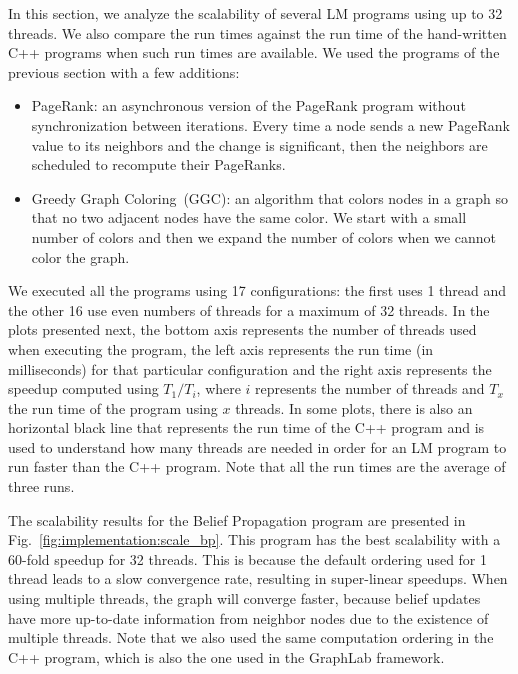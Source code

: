 In this section, we analyze the scalability of several LM programs using up to
32 threads. We also compare the run times against the run time of the
hand-written C++ programs when such run times are available. We used the
programs of the previous section with a few additions:

\begin{itemize}

      \item PageRank: an asynchronous version of the PageRank program without
         synchronization between iterations. Every time a node sends a new
         PageRank value to its neighbors and the change is significant, then the
         neighbors are scheduled to recompute their PageRanks.

      \item Greedy Graph Coloring~(GGC): an algorithm that colors nodes in a
         graph so that no two adjacent nodes have the same color. We start with
         a small number of colors and then we expand the number of colors when
         we cannot color the graph.

\end{itemize}

We executed all the programs using 17 configurations: the first uses 1 thread
and the other 16 use even numbers of threads for a maximum of 32 threads. In the
plots presented next, the bottom axis represents the number of threads used when
executing the program, the left axis represents the run time (in milliseconds)
for that particular configuration and the right axis represents the speedup
computed using $T_1/T_i$, where $i$ represents the number of threads and
$T_x$ the run time of the program using $x$ threads.  In some plots, there is
also an horizontal black line that represents the run time of the C++ program
and is used to understand how many threads are needed in order for an LM program
to run faster than the C++ program. Note that all the run times are the average
of three runs.

\newcommand{\plotsize}[0]{0.4}

The scalability results for the Belief Propagation program are presented in
Fig.~\ref{fig:implementation:scale_bp}. This program has the best scalability
with a 60-fold speedup for 32 threads. This is because the default ordering used
for 1 thread leads to a slow convergence rate, resulting in super-linear
speedups. When using multiple threads, the graph will converge faster, because
belief updates have more up-to-date information from neighbor nodes due to the
existence of multiple threads.  Note that we also used the same computation
ordering in the C++ program, which is also the one used in the GraphLab
framework.

